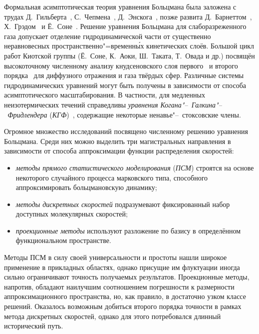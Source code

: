 Формальная асимптотическая теория уравнения Больцмана была заложена с трудах Д.~Гильберта~\autocite{Hilbert1912},
С.~Чепмена~\autocite{Chapman1916}, Д.~Энскога~\autocite{Enskog1917},
позже развита Д.~Барнеттом~\autocite{Burnett1935}, Х.~Грэдом~\autocite{Grad1963a} и Ё.~Соне~\autocite{Sone2002}.
Решение уравнения Больцмана для слаборазреженного газа допускает отделение гидродинамической части
от существенно неравновесных пространственно"=временн\'{ы}х кинетических слоёв.
Большой цикл работ Киотской группы (Ё.~Соне, К.~Аоки, Ш.~Таката, Т.~Овада и др.)
посвящён высокоточному численному анализу кнудсеновского слоя первого~\autocite{Ohwada1989creep, Ohwada1989jump}
и второго порядка~\autocite{Ohwada1992, Takata2015second, Takata2015curvature}
для диффузного отражения и газа твёрдых сфер.
Различные системы гидродинамических уравнений могут быть получены в зависимости от способа асимптотического масштабирования.
В частности, для медленных неизотермических течений справедливы
\emph{уравнения Когана"--~Галкина"--~Фридлендера} (\emph{КГФ})~\autocite{Kogan1976},
содержащие некоторые ненавье"--~стоксовские члены.

Огромное множество исследований посвящено численному решению уравнения Больцмана.
Среди них можно выделить три магистральных направления в зависимости от способа аппроксимации
функции распределения скоростей:
\begin{itemize}
    \item \emph{методы прямого статистического моделирования} (\emph{ПСМ})
    строятся на основе некоторого случайного процесса марковского типа,
    способного аппроксимировать больцмановскую динамику;
    \item \emph{методы дискретных скоростей} подразумевают фиксированный набор доступных молекулярных скоростей;
    \item \emph{проекционные методы} используют разложение по базису в определённом функциональном пространстве.
\end{itemize}
Методы ПСМ в силу своей универсальности и простоты нашли широкое применение в прикладных областях,
однако присущие им флуктуации иногда сильно ограничивают точность получаемых результатов.
Проекционные методы, напротив, обладают наилучшим соотношением погрешности к размерности аппроксимационного пространства,
но, как правило, в достаточно узком классе решений.
Оказалось возможным добиться второго порядка точности в рамках метода дискретных скоростей,
однако для этого потребовался длинный исторический путь.

